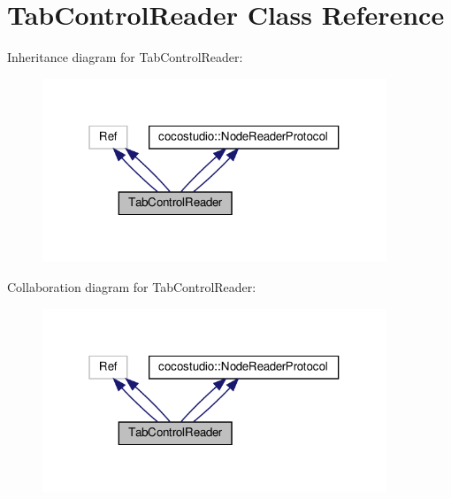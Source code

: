 \hypertarget{classTabControlReader}{}\section{Tab\+Control\+Reader Class Reference}
\label{classTabControlReader}


Inheritance diagram for Tab\+Control\+Reader\+:
\nopagebreak
\begin{figure}[H]
\begin{center}
\leavevmode
\includegraphics[width=292pt]{classTabControlReader__inherit__graph}
\end{center}
\end{figure}


Collaboration diagram for Tab\+Control\+Reader\+:
\nopagebreak
\begin{figure}[H]
\begin{center}
\leavevmode
\includegraphics[width=292pt]{classTabControlReader__coll__graph}
\end{center}
\end{figure}
